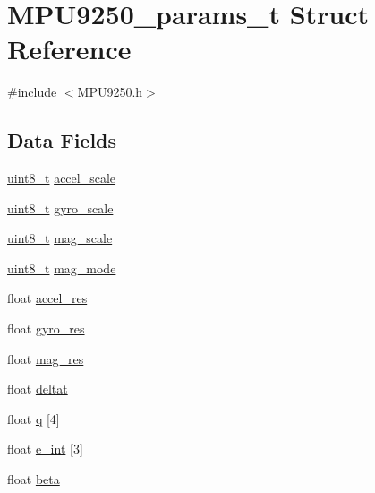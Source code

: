 \hypertarget{struct_m_p_u9250__params__t}{}\section{M\+P\+U9250\+\_\+params\+\_\+t Struct Reference}
\label{struct_m_p_u9250__params__t}


{\ttfamily \#include $<$M\+P\+U9250.\+h$>$}

\subsection*{Data Fields}
\begin{DoxyCompactItemize}
\item 
\mbox{\hyperlink{_regs___l_p_c176x_8h_aba7bc1797add20fe3efdf37ced1182c5}{uint8\+\_\+t}} \mbox{\hyperlink{struct_m_p_u9250__params__t_af2f992065f03de185e0d1b48c0737b6a}{accel\+\_\+scale}}
\item 
\mbox{\hyperlink{_regs___l_p_c176x_8h_aba7bc1797add20fe3efdf37ced1182c5}{uint8\+\_\+t}} \mbox{\hyperlink{struct_m_p_u9250__params__t_acd0b0f8ab226f8b13dcebbd6ed133671}{gyro\+\_\+scale}}
\item 
\mbox{\hyperlink{_regs___l_p_c176x_8h_aba7bc1797add20fe3efdf37ced1182c5}{uint8\+\_\+t}} \mbox{\hyperlink{struct_m_p_u9250__params__t_a6e3d126ef32c3eaf44caeeb393c3ba3b}{mag\+\_\+scale}}
\item 
\mbox{\hyperlink{_regs___l_p_c176x_8h_aba7bc1797add20fe3efdf37ced1182c5}{uint8\+\_\+t}} \mbox{\hyperlink{struct_m_p_u9250__params__t_ab5f2e24f3845ba5d789035e298fef1c0}{mag\+\_\+mode}}
\item 
float \mbox{\hyperlink{struct_m_p_u9250__params__t_a04dfd9e4a7dade221e39c966919b3860}{accel\+\_\+res}}
\item 
float \mbox{\hyperlink{struct_m_p_u9250__params__t_a1d0204e36313495c6b8b00fc6f65e615}{gyro\+\_\+res}}
\item 
float \mbox{\hyperlink{struct_m_p_u9250__params__t_ae69cca96b2cbb9eddab9295fad1a1e07}{mag\+\_\+res}}
\item 
float \mbox{\hyperlink{struct_m_p_u9250__params__t_aaba29b16ce0d90b9299506057c278229}{deltat}}
\item 
float \mbox{\hyperlink{struct_m_p_u9250__params__t_acbffa34110f15b21994d3d087a0f4e7f}{q}} \mbox{[}4\mbox{]}
\item 
float \mbox{\hyperlink{struct_m_p_u9250__params__t_a469b00e5356dead6f973f30e223ed65c}{e\+\_\+int}} \mbox{[}3\mbox{]}
\item 
float \mbox{\hyperlink{struct_m_p_u9250__params__t_aa773d9a6c0ccefaa0fc9ab66fec68ec1}{beta}}
\end{DoxyCompactItemize}


